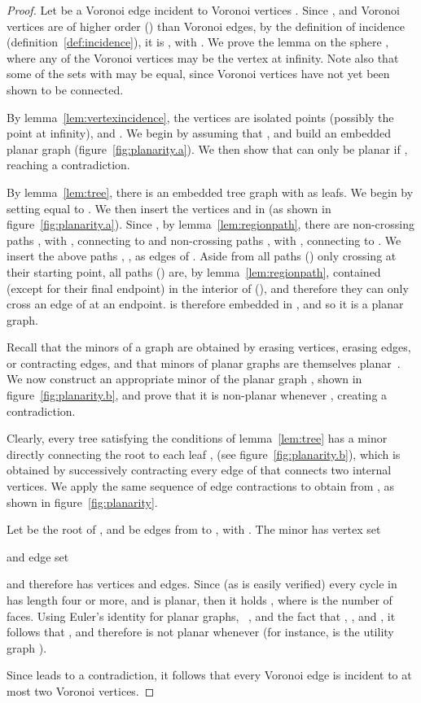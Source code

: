 \documentclass[11pt]{article}
\begin{document}
\begin{proof}
	Let  be a Voronoi edge incident to Voronoi vertices . 
Since , 
		and Voronoi vertices are of higher order () than Voronoi edges, 
		by the definition of incidence (definition~\ref{def:incidence}), it is , with . 
	We prove the lemma on the sphere , where any of the Voronoi vertices may be the vertex at infinity. 
	Note also that some of the sets  with  may be equal, 
	since Voronoi vertices have not yet been shown to be connected. 
	

By lemma~\ref{lem:vertexincidence}, 
	the vertices  are isolated points
	(possibly the point at infinity), 
	and . 
We begin by assuming that , and build an embedded planar graph  (figure~\ref{fig:planarity.a}). 
We then show that  can only be planar if , reaching a contradiction. 


By lemma~\ref{lem:tree}, there is an embedded tree graph 
	with  as leafs. 
We begin by setting  equal to . 
We then insert the vertices  and  in  (as shown in figure~\ref{fig:planarity.a}). 
Since , 
	by lemma~\ref{lem:regionpath}, 
	there are non-crossing paths , with , 
	connecting  to  and non-crossing paths , with , 
	connecting  to . We insert the above paths , , as edges of . 
Aside from all paths  () only crossing
	 at their starting point,
all paths  () are, by lemma~\ref{lem:regionpath},
	 contained (except for their final endpoint) 
	in the interior of  (), 
	and therefore they can only cross an edge of  at an endpoint. 
 is therefore embedded in , and so it is a planar graph. 


Recall that the minors of a graph are obtained by erasing vertices, erasing edges, or contracting edges, 
	and that minors of planar graphs are themselves planar~\cite[p.\ 269]{bondy2008graph}. 
We now construct an appropriate minor  of the planar graph , 
	shown in figure~\ref{fig:planarity.b}, 
	and prove that it is non-planar whenever , creating a contradiction. 




Clearly, every tree  satisfying the conditions of lemma~\ref{lem:tree} has a minor  
	directly connecting the root to each leaf ,  (see figure~\ref{fig:planarity.b}), 
	which is obtained by successively contracting every edge of  that connects two internal vertices. 
We apply the same sequence of edge contractions to obtain  from , as shown in figure~\ref{fig:planarity}. 



Let  be the root of , and  be edges from  to , with . 
The minor  has vertex set
	
and edge set
	
and therefore  has  vertices and  edges.  
Since (as is easily verified) every cycle in  has length four or more, and  is planar, 
	then it holds , where  is the number of faces. 
Using Euler's identity for planar graphs, ~\cite{bondy2008graph}, 
	and the fact that , , and , it follows that , 
	and therefore  is not planar whenever 
(for instance,  is the utility graph ). 




Since  leads to a contradiction, it follows that every Voronoi edge is incident to at most two Voronoi vertices.
\end{proof}
\end{document}
